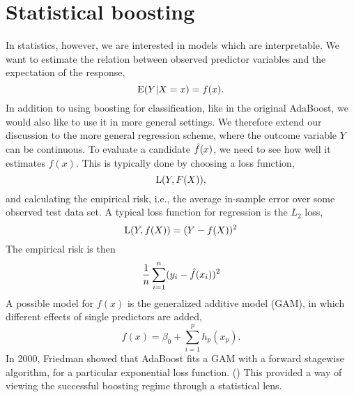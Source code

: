 \section{Statistical boosting}\label{sec:sboost}
In statistics, however, we are interested in models which are interpretable. We want to estimate the relation between observed predictor variables and the expectation of the response,
\begin{equation*}
    \operatorname{E}(Y|X=x)=f(x).
\end{equation*}
In addition to using boosting for classification, like in the original AdaBoost, we would also like to use it in more general settings. We therefore extend our discussion to the more general regression scheme, where the outcome variable $Y$ can be continuous. To evaluate a candidate $\hat{f}(x)$, we need to see how well it estimates $f(x)$. This is typically done by choosing a loss function,
\begin{equation}\label{eq:loss}
    \operatorname{L}(Y, F(X)),
\end{equation}
and calculating the empirical risk, i.e., the average in-sample error over some observed test data set. A typical loss function for regression is the $L_2$ loss,
\begin{equation*}
    \operatorname{L}(Y, f(X))=(Y-f(X))^2
\end{equation*}
The empirical risk is then
\begin{equation*}
    \frac{1}{n}\sum_{i=1}^n (y_i-\hat{f}(x_i))^2
\end{equation*}
A possible model for $f(x)$ is the generalized additive model (GAM), in which different effects of single predictors are added,
\begin{equation}\label{eq:gam}
    f(x)=\beta_0+\sum_{i=1}^p h_p(x_p).
\end{equation}
In 2000, Friedman showed that AdaBoost fits a GAM with a forward stagewise algorithm, for a particular exponential loss function. (\cite{friedman2000}) This provided a way of viewing the successful boosting regime through a statistical lens.

